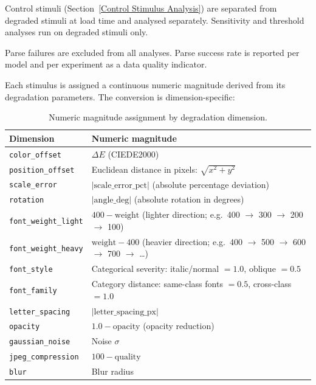 Control stimuli (Section~\ref{Control Stimulus Analysis}) are separated from degraded stimuli at load time and analysed separately. Sensitivity and threshold analyses run on degraded stimuli only.

Parse failures are excluded from all analyses. Parse success rate is reported per model and per experiment as a data quality indicator.

Each stimulus is assigned a continuous numeric magnitude derived from its degradation parameters. The conversion is dimension-specific:

\begin{table}[htbp]
\centering
\caption{Numeric magnitude assignment by degradation dimension.}
\label{tab:magnitude-conversion}
\begin{tabular}{ll}
\toprule
Dimension & Numeric magnitude \\
\midrule
\texttt{color\_offset}      & $\Delta E$ (CIEDE2000) \\
\texttt{position\_offset}   & Euclidean distance in pixels: $\sqrt{x^2 + y^2}$ \\
\texttt{scale\_error}       & $|\text{scale\_error\_pct}|$ (absolute percentage deviation) \\
\texttt{rotation}           & $|\text{angle\_deg}|$ (absolute rotation in degrees) \\
\texttt{font\_weight\_light}  & $400 - \text{weight}$ (lighter direction; e.g.\ 400 $\to$ 300 $\to$ 200 $\to$ 100) \\
\texttt{font\_weight\_heavy}  & $\text{weight} - 400$ (heavier direction; e.g.\ 400 $\to$ 500 $\to$ 600 $\to$ 700 $\to$ \ldots) \\
\texttt{font\_style}        & Categorical severity: italic/normal $= 1.0$, oblique $= 0.5$ \\
\texttt{font\_family}       & Category distance: same-class fonts $= 0.5$, cross-class $= 1.0$ \\
\texttt{letter\_spacing}    & $|\text{letter\_spacing\_px}|$ \\
\texttt{opacity}            & $1.0 - \text{opacity}$ (opacity reduction) \\
\texttt{gaussian\_noise}    & Noise $\sigma$ \\
\texttt{jpeg\_compression}  & $100 - \text{quality}$ \\
\texttt{blur}               & Blur radius \\
\bottomrule
\end{tabular}
\end{table}

